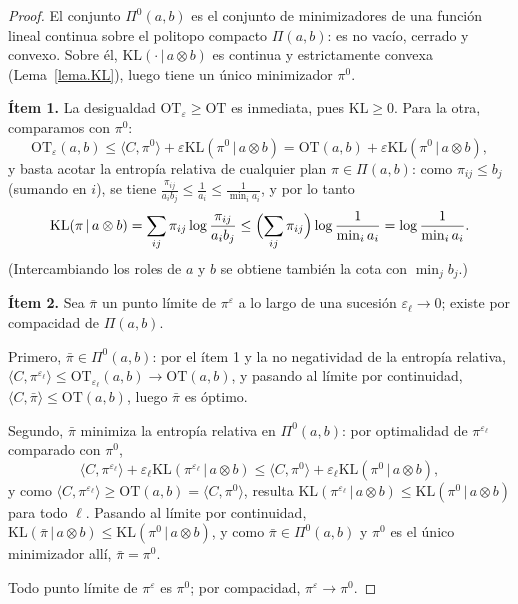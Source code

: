 \documentclass[12pt, a4paper]{amsbook}
\theoremstyle{remark}
\theoremstyle{definition}
\numberwithin{section}{chapter}
\numberwithin{subsection}{section}
\numberwithin{equation}{section}
\numberwithin{figure}{chapter}
\begin{document}
\begin{proof}
El conjunto $\Pi^0(a,b)$ es el conjunto de minimizadores de una función
lineal continua sobre el politopo compacto $\Pi(a,b)$: es no vacío, cerrado y
convexo. Sobre él, $\mathrm{KL}(\cdot\,|\,a\otimes b)$ es continua y
estrictamente convexa (Lema~\ref{lema.KL}), luego tiene un único minimizador
$\pi^0$.

\medskip
\textbf{Ítem 1.} La desigualdad $\mathrm{OT}_\varepsilon\ge\mathrm{OT}$ es
inmediata, pues $\mathrm{KL}\ge0$. Para la otra, comparamos con $\pi^0$:
\[
\mathrm{OT}_\varepsilon(a,b)\le\langle C,\pi^0\rangle+\varepsilon\mathrm{KL}(\pi^0\,|\,a\otimes b)
=\mathrm{OT}(a,b)+\varepsilon\mathrm{KL}(\pi^0\,|\,a\otimes b),
\]
y basta acotar la entropía relativa de cualquier plan $\pi\in\Pi(a,b)$: como
$\pi_{ij}\le b_j$ (sumando en $i$), se tiene $\frac{\pi_{ij}}{a_ib_j}\le\frac1{a_i}\le\frac1{\min_i a_i}$, y por lo tanto
\[
\mathrm{KL}(\pi\,|\,a\otimes b)=\sum_{ij}\pi_{ij}\log\frac{\pi_{ij}}{a_ib_j}
\le\Bigl(\sum_{ij}\pi_{ij}\Bigr)\log\frac1{\min_ia_i}=\log\frac1{\min_ia_i}.
\]
(Intercambiando los roles de $a$ y $b$ se obtiene también la cota con
$\min_j b_j$.)

\medskip
\textbf{Ítem 2.} Sea $\bar\pi$ un punto límite de $\pi^\varepsilon$ a lo largo
de una sucesión $\varepsilon_\ell\to0$; existe por compacidad de $\Pi(a,b)$.

Primero, $\bar\pi\in\Pi^0(a,b)$: por el ítem 1 y la no negatividad de la
entropía relativa,
$\langle C,\pi^{\varepsilon_\ell}\rangle\le\mathrm{OT}_{\varepsilon_\ell}(a,b)\to\mathrm{OT}(a,b)$,
y pasando al límite por continuidad, $\langle C,\bar\pi\rangle\le\mathrm{OT}(a,b)$,
luego $\bar\pi$ es óptimo.

Segundo, $\bar\pi$ minimiza la entropía relativa en $\Pi^0(a,b)$: por
optimalidad de $\pi^{\varepsilon_\ell}$ comparado con $\pi^0$,
\[
\langle C,\pi^{\varepsilon_\ell}\rangle+\varepsilon_\ell\mathrm{KL}(\pi^{\varepsilon_\ell}\,|\,a\otimes b)
\le\langle C,\pi^0\rangle+\varepsilon_\ell\mathrm{KL}(\pi^0\,|\,a\otimes b),
\]
y como $\langle C,\pi^{\varepsilon_\ell}\rangle\ge\mathrm{OT}(a,b)=\langle C,\pi^0\rangle$,
resulta $\mathrm{KL}(\pi^{\varepsilon_\ell}\,|\,a\otimes b)\le\mathrm{KL}(\pi^0\,|\,a\otimes b)$
para todo $\ell$. Pasando al límite por continuidad,
$\mathrm{KL}(\bar\pi\,|\,a\otimes b)\le\mathrm{KL}(\pi^0\,|\,a\otimes b)$, y
como $\bar\pi\in\Pi^0(a,b)$ y $\pi^0$ es el único minimizador allí,
$\bar\pi=\pi^0$.

Todo punto límite de $\pi^\varepsilon$ es $\pi^0$; por compacidad,
$\pi^\varepsilon\to\pi^0$.
\end{proof}
\end{document}
